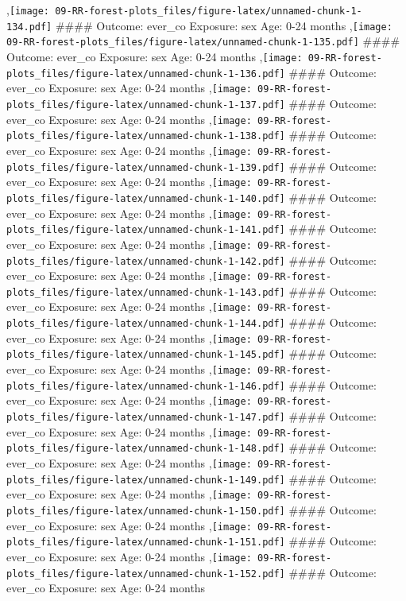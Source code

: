 \documentclass[
  9pt,
]{book}
\begin{document}
,\texttt{[image: 09-RR-forest-plots\_files/figure-latex/unnamed-chunk-1-134.pdf]}
\#\#\#\# Outcome: ever\_co Exposure: sex Age: 0-24 months
,\texttt{[image: 09-RR-forest-plots\_files/figure-latex/unnamed-chunk-1-135.pdf]}
\#\#\#\# Outcome: ever\_co Exposure: sex Age: 0-24 months
,\texttt{[image: 09-RR-forest-plots\_files/figure-latex/unnamed-chunk-1-136.pdf]}
\#\#\#\# Outcome: ever\_co Exposure: sex Age: 0-24 months
,\texttt{[image: 09-RR-forest-plots\_files/figure-latex/unnamed-chunk-1-137.pdf]}
\#\#\#\# Outcome: ever\_co Exposure: sex Age: 0-24 months
,\texttt{[image: 09-RR-forest-plots\_files/figure-latex/unnamed-chunk-1-138.pdf]}
\#\#\#\# Outcome: ever\_co Exposure: sex Age: 0-24 months
,\texttt{[image: 09-RR-forest-plots\_files/figure-latex/unnamed-chunk-1-139.pdf]}
\#\#\#\# Outcome: ever\_co Exposure: sex Age: 0-24 months
,\texttt{[image: 09-RR-forest-plots\_files/figure-latex/unnamed-chunk-1-140.pdf]}
\#\#\#\# Outcome: ever\_co Exposure: sex Age: 0-24 months
,\texttt{[image: 09-RR-forest-plots\_files/figure-latex/unnamed-chunk-1-141.pdf]}
\#\#\#\# Outcome: ever\_co Exposure: sex Age: 0-24 months
,\texttt{[image: 09-RR-forest-plots\_files/figure-latex/unnamed-chunk-1-142.pdf]}
\#\#\#\# Outcome: ever\_co Exposure: sex Age: 0-24 months
,\texttt{[image: 09-RR-forest-plots\_files/figure-latex/unnamed-chunk-1-143.pdf]}
\#\#\#\# Outcome: ever\_co Exposure: sex Age: 0-24 months
,\texttt{[image: 09-RR-forest-plots\_files/figure-latex/unnamed-chunk-1-144.pdf]}
\#\#\#\# Outcome: ever\_co Exposure: sex Age: 0-24 months
,\texttt{[image: 09-RR-forest-plots\_files/figure-latex/unnamed-chunk-1-145.pdf]}
\#\#\#\# Outcome: ever\_co Exposure: sex Age: 0-24 months
,\texttt{[image: 09-RR-forest-plots\_files/figure-latex/unnamed-chunk-1-146.pdf]}
\#\#\#\# Outcome: ever\_co Exposure: sex Age: 0-24 months
,\texttt{[image: 09-RR-forest-plots\_files/figure-latex/unnamed-chunk-1-147.pdf]}
\#\#\#\# Outcome: ever\_co Exposure: sex Age: 0-24 months
,\texttt{[image: 09-RR-forest-plots\_files/figure-latex/unnamed-chunk-1-148.pdf]}
\#\#\#\# Outcome: ever\_co Exposure: sex Age: 0-24 months
,\texttt{[image: 09-RR-forest-plots\_files/figure-latex/unnamed-chunk-1-149.pdf]}
\#\#\#\# Outcome: ever\_co Exposure: sex Age: 0-24 months
,\texttt{[image: 09-RR-forest-plots\_files/figure-latex/unnamed-chunk-1-150.pdf]}
\#\#\#\# Outcome: ever\_co Exposure: sex Age: 0-24 months
,\texttt{[image: 09-RR-forest-plots\_files/figure-latex/unnamed-chunk-1-151.pdf]}
\#\#\#\# Outcome: ever\_co Exposure: sex Age: 0-24 months
,\texttt{[image: 09-RR-forest-plots\_files/figure-latex/unnamed-chunk-1-152.pdf]}
\#\#\#\# Outcome: ever\_co Exposure: sex Age: 0-24 months
\end{document}
